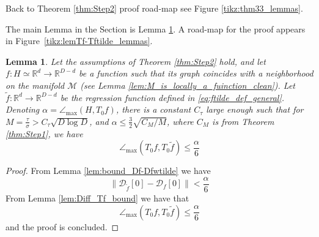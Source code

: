 \documentclass[12pt]{article}
\newtheorem{Lemma}[Theorem]{Lemma}
\theoremstyle{remark}
\newcommand{\RR}{\mathbb{R}}
\newcommand{\MM}{\mathcal{M}}
\newcommand{\DD}{\mathcal{D}}
\newcommand{\wtilde}[1]{\widetilde{#1}}
\newcommand{\maxangle}{\angle_{\max}}
\begin{document}
\begin{appendices}
Back to Theorem \ref{thm:Step2} proof road-map see Figure \ref{tikz:thm33_lemmas}.


The main Lemma in the Section is Lemma \ref{lem:Tf_TtildeF_D}. A road-map for the proof appears in Figure~\ref{tikz:lemTf-Tftilde_lemmas}.

\begin{Lemma}\label{lem:Tf_TtildeF_D}
    Let the assumptions of Theorem \ref{thm:Step2} hold, and let $ f:H\simeq\RR^d\to\RR^{D-d} $ be a function such that its graph coincides with a neighborhood on the manifold $\MM$ (see Lemma \ref{lem:M_is_locally_a_fuinction_clean}). Let $\wtilde f:\RR^d\to\RR^{D-d} $ be the regression function defined in \eqref{eq:ftilde_def_general}. Denoting $\alpha = \maxangle(H, T_0 f)$, there is a constant $C_\tau$ large enough such that for $M = \frac{\tau}{\sigma}>C_\tau\sqrt{D \log D}$, and $\alpha \leq \frac{3}{2}\sqrt{C_M/M}$, where $C_M$ is from Theorem \ref{thm:Step1}, we have 
    \[
	\maxangle(T_0 f, T_0 {\wtilde{f}}) 
	\leq  
	 \frac{\alpha}{6} 
	\]
\end{Lemma}
\begin{proof}
From Lemma \ref{lem:bound_Df-Dfwtilde} we have 
\[
\|\DD_{\wtilde{f}}[0] - \DD_f[0]\| < \frac{\alpha}{6}
\]
From Lemma \ref{lem:Diff_Tf_bound} we have that 
    \[
	\maxangle(T_0 f, T_0 {\wtilde{f}}) 
	\leq   \frac{\alpha}{6}
	\]
	and the proof is concluded. 
\end{proof}



\end{appendices}
\end{document}
